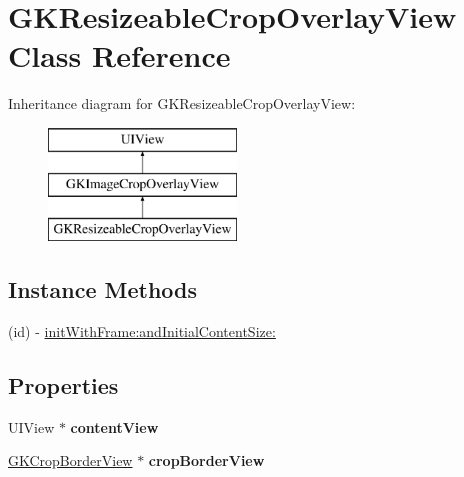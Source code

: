 \hypertarget{interface_g_k_resizeable_crop_overlay_view}{}\section{G\+K\+Resizeable\+Crop\+Overlay\+View Class Reference}
\label{interface_g_k_resizeable_crop_overlay_view}
Inheritance diagram for G\+K\+Resizeable\+Crop\+Overlay\+View\+:\begin{figure}[H]
\begin{center}
\leavevmode
\includegraphics[height=3.000000cm]{interface_g_k_resizeable_crop_overlay_view}
\end{center}
\end{figure}
\subsection*{Instance Methods}
\begin{DoxyCompactItemize}
\item 
(id) -\/ \hyperlink{interface_g_k_resizeable_crop_overlay_view_a7c6893379dbb1e6e2cb4503a0c1dd5f4}{init\+With\+Frame\+:and\+Initial\+Content\+Size\+:}
\end{DoxyCompactItemize}
\subsection*{Properties}
\begin{DoxyCompactItemize}
\item 
\hypertarget{interface_g_k_resizeable_crop_overlay_view_ac677776e3d521b714ec4aec4352dea57}{}U\+I\+View $\ast$ {\bfseries content\+View}\label{interface_g_k_resizeable_crop_overlay_view_ac677776e3d521b714ec4aec4352dea57}

\item 
\hypertarget{interface_g_k_resizeable_crop_overlay_view_ab26b0dbb730a1f8513c2b8d7b21a4eda}{}\hyperlink{interface_g_k_crop_border_view}{G\+K\+Crop\+Border\+View} $\ast$ {\bfseries crop\+Border\+View}\label{interface_g_k_resizeable_crop_overlay_view_ab26b0dbb730a1f8513c2b8d7b21a4eda}

\end{DoxyCompactItemize}


